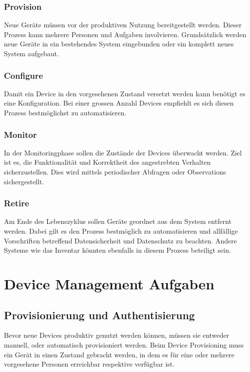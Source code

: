\subsubsection{Provision}
Neue Geräte müssen vor der produktiven Nutzung bereitgestellt werden. Dieser Prozess kann mehrere Personen und Aufgaben involvieren. Grundsätzlich werden neue Geräte in ein bestehendes System eingebunden oder ein komplett neues System aufgebaut.
\subsubsection{Configure}
Damit ein Device in den vorgesehenen Zustand versetzt werden kann benötigt es eine Konfiguration. Bei einer grossen Anzahl Devices empfiehlt es sich diesen Prozess bestmöglichst zu automatisieren. 
\subsubsection{Monitor}
In der Monitoringphase sollen die Zustände der Devices überwacht werden. Ziel ist es, die Funktionalität und Korrektheit des angestrebten Verhalten sicherzustellen. Dies wird mittels periodischer Abfragen oder Observations sichergestellt. 
\subsubsection{Retire}
Am Ende des Lebenszyklus sollen Geräte geordnet aus dem System entfernt werden. Dabei gilt es den Prozess bestmöglich zu automatisieren und allfällige Vorschriften betreffend Datensicherheit und Datenschutz zu beachten. Andere Systeme wie das Inventar könnten ebenfalls in diesem Prozess beteiligt sein.
\section{Device Management Aufgaben}
\subsection{Provisionierung und Authentisierung}
Bevor neue Devices produktiv genutzt werden können, müssen sie entweder manuell, oder automatisch provisioniert werden. Beim Device Provisioning muss ein Gerät in einen Zustand gebracht werden, in dem es für eine oder mehrere vorgesehene Personen erreichbar respektive verfügbar ist.

